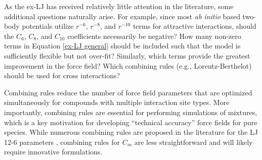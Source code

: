 \documentclass[12pt,a4paper]{article}
\begin{document}

As the ex-LJ has received relatively little attention in the literature, some additional questions naturally arise. For example, since most \textit{ab initio} based two-body potentials utilize $r^{-6}$, $r^{-8}$, and $r^{-10}$ terms for attractive interactions, should the $C_6$, $C_8$, and $C_{10}$ coefficients necessarily be negative? How many non-zero terms in Equation \ref{ex-LJ general} should be included such that the model is sufficiently flexible but not over-fit? Similarly, which terms provide the greatest improvement in the force field? Which combining rules (e.g., Lorentz-Berthelot) should be used for cross interactions?

Combining rules reduce the number of force field parameters that are optimized simultaneously for compounds with multiple interaction site types. More importantly, combining rules are essential for performing simulations of mixtures, which is a key motivation for developing ``technical accuracy'' force fields for pure species. While numerous combining rules are proposed in the literature for the LJ 12-6 parameters \cite{Schnabel2007}, combining rules for $C_m$ are less straightforward and will likely require innovative formulations.

\end{document}
